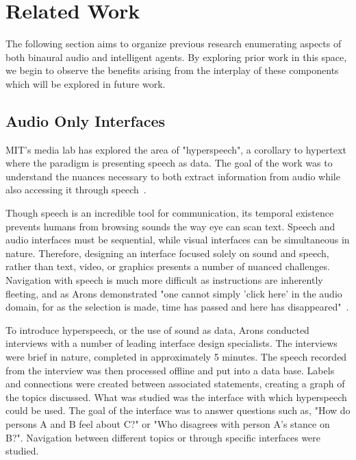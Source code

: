 \newpage                                                \chapter{Related Work}

The following section aims to organize previous research enumerating aspects
of both binaural audio and intelligent agents. By exploring prior work in this
space, we begin to observe the benefits arising from the interplay of these
components which will be explored in future work.

\section{                  Audio Only Interfaces                             }

MIT's media lab has explored the area of "hyperspeech", a corollary to
hypertext where the paradigm is presenting speech as data.  The goal of the
work was to understand the nuances necessary to both extract information from
audio while also accessing it through speech~\cite{arons1991hyperspeech}.

Though speech is an incredible tool for communication, its temporal existence
prevents humans from browsing sounds the way eye can scan text.  Speech and
audio interfaces must be sequential, while visual interfaces can be
simultaneous in nature.  Therefore, designing an interface focused solely on
sound and speech, rather than text, video, or graphics presents a number of
nuanced challenges.  Navigation with speech is much more difficult as
instructions are inherently fleeting, and as Arons demonstrated "one cannot simply
'click here' in the audio domain, for as the selection is made, time has passed
and here has  disappeared"~\cite{arons1991hyperspeech}.

To introduce hyperspeech, or the use of sound as data, Arons conducted interviews
with a number of leading interface design specialists.  The interviews were
brief in nature, completed in approximately 5 minutes.  The speech recorded
from the interview was then processed offline and put into a data base.
Labels and connections were created between associated statements, creating a
graph of the topics discussed.  What was studied was the interface with which
hyperspeech could be used.  The goal of the interface was to answer questions
such as, "How do persons A and B feel about C?" or "Who disagrees with person
A's stance on B?".  Navigation between different topics or through specific
interfaces were studied.

